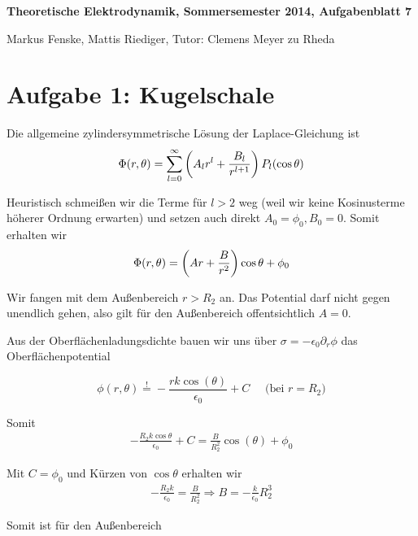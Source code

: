 \documentclass[a4paper,german,12pt,smallheadings]{scrartcl}
\begin{document}
\allowdisplaybreaks %
\begin{center}
\bfseries %
\sffamily %
\vspace{-40pt}
Theoretische Elektrodynamik, Sommersemester 2014, Aufgabenblatt 7

Markus Fenske, Mattis Riediger, Tutor: Clemens Meyer zu Rheda
\vspace{-10pt}
\end{center}

\section*{Aufgabe 1: Kugelschale}
Die allgemeine zylindersymmetrische Lösung der Laplace-Gleichung ist
\begin{equation}
  \Phi(r, \theta) = \sum_{l=0}^\infty \del{A_lr^l + \frac{B_l}{r^{l+1}}} P_l(\cos \theta)
\end{equation}

Heuristisch schmeißen wir die Terme für $l>2$ weg (weil wir keine Kosinusterme
höherer Ordnung erwarten) und setzen auch direkt $A_0 = \phi_0, B_0 = 0$. Somit
erhalten wir
\begin{equation}
  \Phi(r, \theta) = \del{Ar + \frac{B}{r^2}} \cos \theta + \phi_0
\end{equation}

Wir fangen mit dem Außenbereich $r > R_2$ an. Das Potential darf nicht gegen
unendlich gehen, also gilt für den Außenbereich offentsichtlich $A=0$.

Aus der Oberflächenladungsdichte bauen wir uns über $\sigma = - \epsilon_0
\partial_r \phi$ das Oberflächenpotential

\begin{equation}
  \phi(r, \theta) \overset{!}{=} - \frac{r k \cos(\theta)}{\epsilon_0} + C \quad\text{ (bei $r=R_2$)}
\end{equation}

Somit
\begin{align*}
  -\frac{R_2 k \cos \theta}{\epsilon_0} + C = \frac{B}{R_2^2} \cos(\theta) + \phi_0
\end{align*}

Mit $C=\phi_0$ und Kürzen von $\cos \theta$ erhalten wir
\begin{align*}
  -\frac{R_2 k}{\epsilon_0} = \frac{B}{R_2^2} \Rightarrow B = -\frac{k}{\epsilon_0} R_2^3
\end{align*}

Somit ist für den Außenbereich
\end{document}
